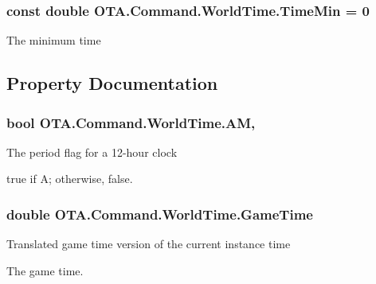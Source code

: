 \subsubsection[{Time\+Min}]{\setlength{\rightskip}{0pt plus 5cm}const double O\+T\+A.\+Command.\+World\+Time.\+Time\+Min = 0}\label{struct_o_t_a_1_1_command_1_1_world_time_a9e80e88421ce390cbb2e432022affc14}


The minimum time 



\subsection{Property Documentation}
\hypertarget{struct_o_t_a_1_1_command_1_1_world_time_ae17654fb336d0a2dd8a930a4d93733db}{}
\subsubsection[{A\+M}]{\setlength{\rightskip}{0pt plus 5cm}bool O\+T\+A.\+Command.\+World\+Time.\+A\+M\hspace{0.3cm}{\ttfamily [get]}, {\ttfamily [set]}}\label{struct_o_t_a_1_1_command_1_1_world_time_ae17654fb336d0a2dd8a930a4d93733db}


The period flag for a 12-\/hour clock 

{\ttfamily true} if A; otherwise, {\ttfamily false}.\hypertarget{struct_o_t_a_1_1_command_1_1_world_time_a0344e73e9fe07b1bc486b4f82ccd1621}{}
\subsubsection[{Game\+Time}]{\setlength{\rightskip}{0pt plus 5cm}double O\+T\+A.\+Command.\+World\+Time.\+Game\+Time\hspace{0.3cm}{\ttfamily [get]}}\label{struct_o_t_a_1_1_command_1_1_world_time_a0344e73e9fe07b1bc486b4f82ccd1621}


Translated game time version of the current instance time 

The game time.\hypertarget{struct_o_t_a_1_1_command_1_1_world_time_a5b31766a1acd5d3f7f6deb12883cd1a9}{}
